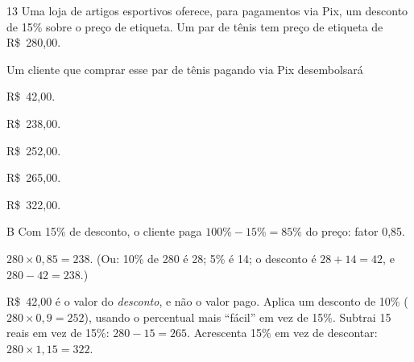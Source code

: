 \begin{questaoinedita}{1}{3}
Uma loja de artigos esportivos oferece, para pagamentos via Pix, um desconto
de 15\% sobre o preço de etiqueta. Um par de tênis tem preço de etiqueta de
R\$~280,00.

Um cliente que comprar esse par de tênis pagando via Pix desembolsará
\begin{alternativas*}[3]
  \item R\$~42,00.
  \item R\$~238,00.
  \item R\$~252,00.
  \item R\$~265,00.
  \item R\$~322,00.
\end{alternativas*}
\end{questaoinedita}
\begin{resolucao}{B}
 Com 15\% de desconto, o cliente paga
$100\% - 15\% = 85\%$ do preço: fator 0,85.

 $280\times 0{,}85 = 238$. (Ou: 10\% de 280 é 28; 5\% é 14;
o desconto é $28 + 14 = 42$, e $280 - 42 = 238$.)

\begin{distratores}
 R\$~42,00 é o valor do \emph{desconto}, e não o valor pago.
 Aplica um desconto de 10\% ($280\times 0{,}9 = 252$), usando o
percentual mais ``fácil'' em vez de 15\%.
 Subtrai 15 reais em vez de 15\%: $280 - 15 = 265$.
 Acrescenta 15\% em vez de descontar: $280\times 1{,}15 = 322$.
\end{distratores}
\end{resolucao}

